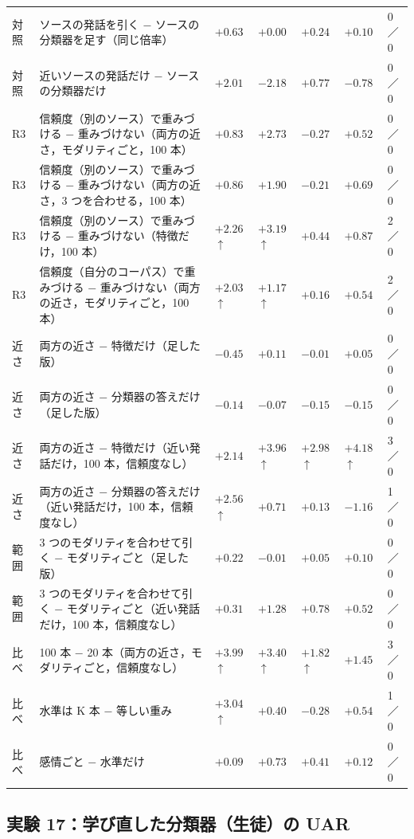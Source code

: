 \begin{longtable}{>{\raggedright}p{0.75cm}>{\raggedright}p{5.6cm}>{\raggedright}p{2.05cm}>{\raggedright}p{2.05cm}>{\raggedright}p{2.05cm}>{\raggedright}p{2.05cm}p{0.75cm}}
対照 & ソースの発話を引く $-$ ソースの分類器を足す（同じ倍率） & $+0.63$ & $+0.00$ & $+0.24$ & $+0.10$ & 0／0 \\
対照 & 近いソースの発話だけ $-$ ソースの分類器だけ & $+2.01$ & $-2.18$ & $+0.77$ & $-0.78$ & 0／0 \\
R3 & 信頼度（別のソース）で重みづける $-$ 重みづけない（両方の近さ，モダリティごと，100 本） & $+0.83$ & $+2.73$ & $-0.27$ & $+0.52$ & 0／0 \\
R3 & 信頼度（別のソース）で重みづける $-$ 重みづけない（両方の近さ，3 つを合わせる，100 本） & $+0.86$ & $+1.90$ & $-0.21$ & $+0.69$ & 0／0 \\
R3 & 信頼度（別のソース）で重みづける $-$ 重みづけない（特徴だけ，100 本） & $+2.26$$\uparrow$ & $+3.19$$\uparrow$ & $+0.44$ & $+0.87$ & 2／0 \\
R3 & 信頼度（自分のコーパス）で重みづける $-$ 重みづけない（両方の近さ，モダリティごと，100 本） & $+2.03$$\uparrow$ & $+1.17$$\uparrow$ & $+0.16$ & $+0.54$ & 2／0 \\
近さ & 両方の近さ $-$ 特徴だけ（足した版） & $-0.45$ & $+0.11$ & $-0.01$ & $+0.05$ & 0／0 \\
近さ & 両方の近さ $-$ 分類器の答えだけ（足した版） & $-0.14$ & $-0.07$ & $-0.15$ & $-0.15$ & 0／0 \\
近さ & 両方の近さ $-$ 特徴だけ（近い発話だけ，100 本，信頼度なし） & $+2.14$ & $+3.96$$\uparrow$ & $+2.98$$\uparrow$ & $+4.18$$\uparrow$ & 3／0 \\
近さ & 両方の近さ $-$ 分類器の答えだけ（近い発話だけ，100 本，信頼度なし） & $+2.56$$\uparrow$ & $+0.71$ & $+0.13$ & $-1.16$ & 1／0 \\
範囲 & 3 つのモダリティを合わせて引く $-$ モダリティごと（足した版） & $+0.22$ & $-0.01$ & $+0.05$ & $+0.10$ & 0／0 \\
範囲 & 3 つのモダリティを合わせて引く $-$ モダリティごと（近い発話だけ，100 本，信頼度なし） & $+0.31$ & $+1.28$ & $+0.78$ & $+0.52$ & 0／0 \\
比べ & 100 本 $-$ 20 本（両方の近さ，モダリティごと，信頼度なし） & $+3.99$$\uparrow$ & $+3.40$$\uparrow$ & $+1.82$$\uparrow$ & $+1.45$ & 3／0 \\
比べ & 水準は K 本 $-$ 等しい重み & $+3.04$$\uparrow$ & $+0.40$ & $-0.28$ & $+0.54$ & 1／0 \\
比べ & 感情ごと $-$ 水準だけ & $+0.09$ & $+0.73$ & $+0.41$ & $+0.12$ & 0／0 \\
\end{longtable}
\clearpage\subsection*{実験 17：学び直した分類器（生徒）の UAR}
